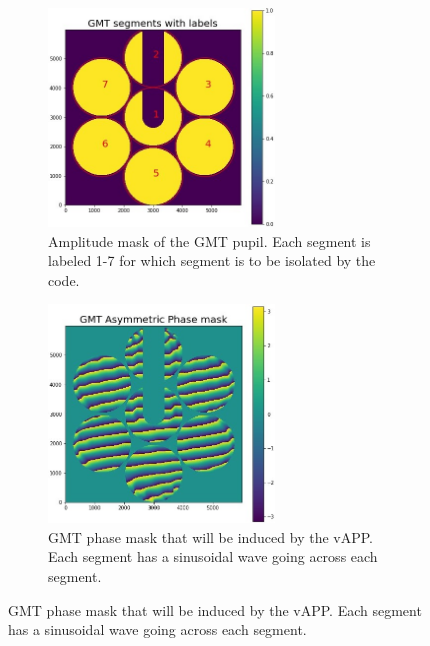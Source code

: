 \begin{figure}[H]
\centering
\begin{subfigure}{.5\textwidth}
  \centering
  \includegraphics[width=6cm]{Figures/GMT_seg_choice.jpg}
  \caption{Amplitude mask of the GMT pupil.  Each segment is labeled 1-7 for which segment is to be isolated by the code.}
  \label{fig:amp_mask}
\end{subfigure}%
\begin{subfigure}{.5\textwidth}
  \centering
  \includegraphics[width=6cm]{Figures/gmt_phase_mask.jpg}
  \caption{GMT phase mask that will be induced by the vAPP.  Each segment has a sinusoidal wave going across each segment.}
  \label{fig:phase_mask}
\end{subfigure}
\label{fig:asym_pupils}
\end{figure}


